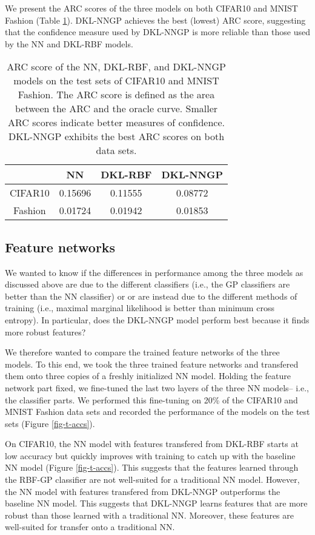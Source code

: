 \documentclass{article}
\begin{document}
We present the ARC scores of the three models on both CIFAR10 and MNIST Fashion (Table \ref{table-arc-scores}). DKL-NNGP achieves the best (lowest) ARC score, suggesting that the confidence measure used by DKL-NNGP is more reliable than those used by the NN and DKL-RBF models.

\begin{table}
\centering
\caption{\label{table-arc-scores} ARC score of the NN, DKL-RBF, and DKL-NNGP models on the test sets of CIFAR10 and MNIST Fashion. The ARC score is defined as the area between the ARC and the oracle curve. Smaller ARC scores indicate better measures of confidence. DKL-NNGP exhibits the best ARC scores on both data sets.}
\begin{tabular}{|c|c|c|c|} \hline
\quad & NN & DKL-RBF & DKL-NNGP \\ \hline
CIFAR10 & 0.15696 & 0.11555 & 0.08772 \\ \hline
Fashion & 0.01724 & 0.01942 & 0.01853 \\ \hline
\end{tabular}
\end{table}

\subsection{Feature networks}

We wanted to know if the differences in performance among the three models as discussed above are due to the different classifiers (i.e., the GP classifiers are better than the NN classifier) or or are instead due to the different methods of training (i.e., maximal marginal likelihood is better than minimum cross entropy). In particular, does the DKL-NNGP model perform best because it finds more robust features?

We therefore wanted to compare the trained feature networks of the three models. To this end, we took the three trained feature networks and transfered them onto three copies of a freshly initialized NN model. Holding the feature network part fixed, we fine-tuned the last two layers of the three NN models-- i.e., the classifier parts. We performed this fine-tuning on 20\% of the CIFAR10 and MNIST Fashion data sets and recorded the performance of the models on the test sets (Figure \ref{fig-t-accs}).

On CIFAR10, the NN model with features transfered from DKL-RBF starts at low accuracy but quickly improves with training to catch up with the baseline NN model (Figure \ref{fig-t-accs}). This suggests that the features learned through the RBF-GP classifier are not well-suited for a traditional NN model. However, the NN model with features transfered from DKL-NNGP outperforms the baseline NN model. This suggests that DKL-NNGP learns features that are more robust than those learned with a traditional NN. Moreover, these features are well-suited for transfer onto a traditional NN.
\end{document}
